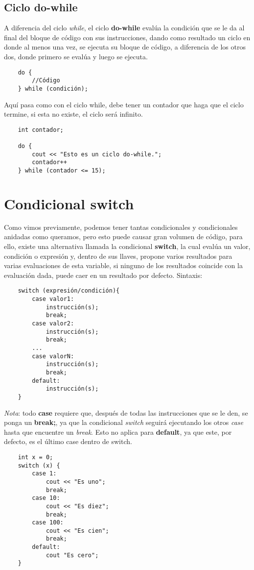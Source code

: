 \subsection{Ciclo do-while}
\hspace{0.55cm}A diferencia del ciclo \textit{while}, el ciclo \textbf{do-while} evalúa la condición que se le da al final del bloque de código con sus instrucciones, dando como resultado un ciclo en donde al menos una vez, se ejecuta su bloque de código, a diferencia de los otros dos, donde primero se evalúa y luego se ejecuta.
\begin{lstlisting}
    do {
        //Código
    } while (condición);
\end{lstlisting}

Aquí pasa como con el ciclo while, debe tener un contador que haga que el ciclo termine, si esta no existe, el ciclo será infinito.
\begin{lstlisting}
    int contador;
    
    do {
        cout << "Esto es un ciclo do-while.";
        contador++
    } while (contador <= 15);
\end{lstlisting}



\section{Condicional switch}
\hspace{0.55cm}Como vimos previamente, podemos tener tantas condicionales y condicionales anidadas como queramos, pero esto puede causar gran volumen de código, para ello, existe una alternativa llamada la condicional \textbf{switch}, la cual evalúa un valor, condición o expresión y,  dentro de sus llaves, propone varios resultados para varias evaluaciones de esta variable, si ninguno de los resultados coincide con la evaluación dada, puede caer en un resultado por defecto. Sintaxis:
\begin{lstlisting}
    switch (expresión/condición){
        case valor1:
            instrucción(s);
            break;
        case valor2:
            instrucción(s);
            break;
        ...
        case valorN:
            instrucción(s);
            break;
        default:
            instrucción(s);
    }
\end{lstlisting}

\textit{Nota}: todo \textbf{case} requiere que, después de todas las instrucciones que se le den, se ponga un \textbf{break;}, ya que la condicional \textit{switch} seguirá ejecutando los otros \textit{case} hasta que encuentre un \textit{break}. Esto no aplica para \textbf{default}, ya que este, por defecto, es el último case dentro de switch.
\begin{lstlisting}
    int x = 0;
    switch (x) {
        case 1:
            cout << "Es uno";
            break;
        case 10:
            cout << "Es diez";
            break;
        case 100:
            cout << "Es cien";
            break;
        default:
            cout "Es cero";
    }
\end{lstlisting}



